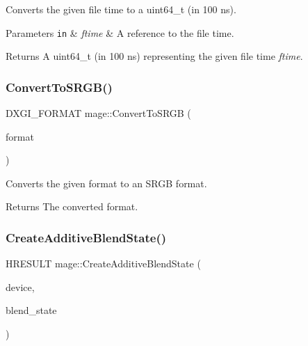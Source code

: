 Converts the given file time to a {\ttfamily uint64\+\_\+t} (in 100 ns).


\begin{DoxyParams}[1]{Parameters}
\mbox{\tt in}  & {\em ftime} & A reference to the file time. \\
\hline
\end{DoxyParams}
\begin{DoxyReturn}{Returns}
A {\ttfamily uint64\+\_\+t} (in 100 ns) representing the given file time {\itshape ftime}. 
\end{DoxyReturn}
\hypertarget{namespacemage_a9d84163ab692956f5f4537a965238a09}{}\label{namespacemage_a9d84163ab692956f5f4537a965238a09} 
\subsubsection{\texorpdfstring{Convert\+To\+S\+R\+G\+B()}{ConvertToSRGB()}}
{\footnotesize\ttfamily D\+X\+G\+I\+\_\+\+F\+O\+R\+M\+AT mage\+::\+Convert\+To\+S\+R\+GB (\begin{DoxyParamCaption}\item[{D\+X\+G\+I\+\_\+\+F\+O\+R\+M\+AT}]{format }\end{DoxyParamCaption})}

Converts the given format to an S\+R\+GB format.

\begin{DoxyReturn}{Returns}
The converted format. 
\end{DoxyReturn}
\hypertarget{namespacemage_a5c813464cd190784dec2d505d3254917}{}\label{namespacemage_a5c813464cd190784dec2d505d3254917} 
\subsubsection{\texorpdfstring{Create\+Additive\+Blend\+State()}{CreateAdditiveBlendState()}}
{\footnotesize\ttfamily H\+R\+E\+S\+U\+LT mage\+::\+Create\+Additive\+Blend\+State (\begin{DoxyParamCaption}\item[{I\+D3\+D11\+Device2 $\ast$}]{device,  }\item[{I\+D3\+D11\+Blend\+State $\ast$$\ast$}]{blend\+\_\+state }\end{DoxyParamCaption})}

